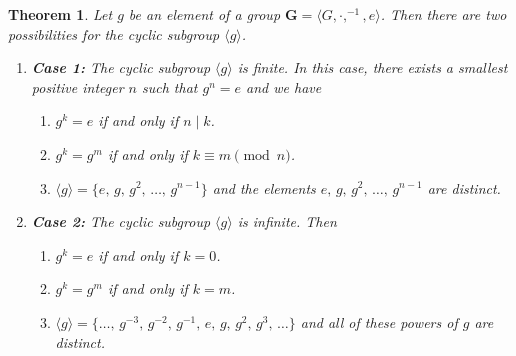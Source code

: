 \documentclass[11pt]{article}
\newcommand{\divides}{\ensuremath{\mid}}
\newcommand{\<}{\ensuremath{\langle}}
\renewcommand{\>}{\ensuremath{\rangle}}
\newcommand{\eye}{\ensuremath{e}}
\theoremstyle{plain}
\newtheorem{thm}{Theorem}%
\theoremstyle{definition}
\begin{document}
\begin{thm} 
\label{thm:4}
   Let $g$ be an element of a group $\mathbf{G} = \<G, \cdot, ^{-1}, e\>$.  
Then there are two possibilities for the cyclic subgroup $\langle g\rangle$.
\begin{enumerate}
\item[{ }]{\bf Case 1:}  The cyclic subgroup $\langle g\rangle$ is finite.  In this
case, there exists a smallest positive integer $n$ such that
$g^n=\eye$ and we have
\begin{enumerate}
\item $g^k=\eye$ if and only if $n\divides k$.
\item  $g^k=g^m$ if and only if $k\equiv m \pmod{n}$.
\item  $\langle g\rangle =\{\eye,\, g,\, g^2,\, \ldots,\, g^{n-1}\}$ and
the elements $\eye,\, g,\, g^2,\, \ldots,\, g^{n-1}$ are distinct.
\end{enumerate}

\item[{ }]{\bf Case 2:}  The cyclic subgroup $\langle g\rangle $ is infinite.
Then
\begin{enumerate}\addtocounter{enumii}{3}
\item $g^k=\eye$ if and only if $k=0$.
\item  $g^k=g^m$ if and only if $k=m$.
\item  $\langle g\rangle =\{ \ldots,\, g^{-3},\, g^{-2},\, g^{-1},\, \eye,\, g,\,g^2,\, g^3,\, \ldots\}$ and all of
these powers of $g$ are distinct.
\end{enumerate}
\end{enumerate}
\end{thm}
\end{document}
